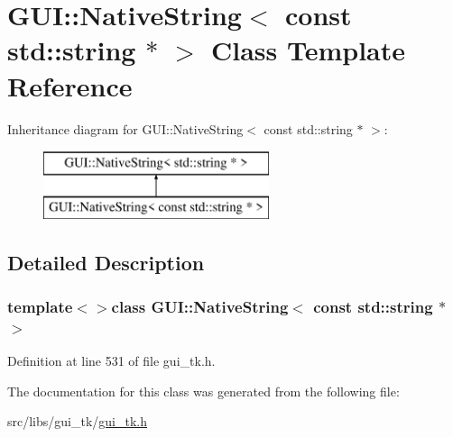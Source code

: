 \hypertarget{classGUI_1_1NativeString_3_01const_01std_1_1string_01_5_01_4}{\section{G\-U\-I\-:\-:Native\-String$<$ const std\-:\-:string $\ast$ $>$ Class Template Reference}
\label{classGUI_1_1NativeString_3_01const_01std_1_1string_01_5_01_4}
}
Inheritance diagram for G\-U\-I\-:\-:Native\-String$<$ const std\-:\-:string $\ast$ $>$\-:\begin{figure}[H]
\begin{center}
\leavevmode
\includegraphics[height=2.000000cm]{classGUI_1_1NativeString_3_01const_01std_1_1string_01_5_01_4}
\end{center}
\end{figure}


\subsection{Detailed Description}
\subsubsection*{template$<$$>$class G\-U\-I\-::\-Native\-String$<$ const std\-::string $\ast$ $>$}



Definition at line 531 of file gui\-\_\-tk.\-h.



The documentation for this class was generated from the following file\-:\begin{DoxyCompactItemize}
\item 
src/libs/gui\-\_\-tk/\hyperlink{gui__tk_8h}{gui\-\_\-tk.\-h}\end{DoxyCompactItemize}
